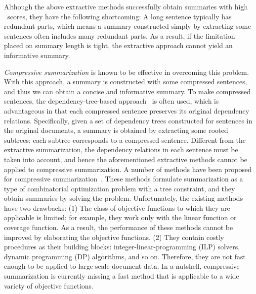 \documentclass[11pt,a4paper]{article}
\begin{document}
	
	Although the above extractive methods successfully 
	obtain summaries with high \rouge\ scores, %
	they have the following shortcoming: 
	A long sentence typically has redundant parts, 
	which means a summary constructed simply by extracting some sentences 
	often includes many redundant parts.  
	As a result, 
	if the limitation placed on summary length is tight, 
	the extractive approach cannot yield an informative summary.  
	
	{\it Compressive summarization} is 
	known to be effective in overcoming this problem.    
	With this approach, a summary is constructed with some compressed sentences, 
	and thus we can obtain a concise and informative summary.  
	To make compressed sentences, 
	the dependency-tree-based approach~\cite{filippova08} is often used, 
	which is advantageous in that 
	each compressed sentence preserves its original dependency relations. 
	Specifically, 
	given a set of dependency trees constructed 
	for sentences in the original documents, 
	a summary is obtained by extracting some rooted subtrees; 
	each subtree corresponds to a compressed sentence.  
	Different from the extractive summarization, 
	the dependency relations in each sentence must be taken into account,  
	and hence the aforementioned extractive methods cannot be applied to compressive summarization. 
	A number of methods have been proposed for compressive summarization~\cite{berg2011jointly,almeida2013fast,morita2013subtree,kikuchi2014single,hirao2017oracle}. 
	These methods formulate summarization   
	as a type of 
	combinatorial optimization problem with a tree constraint, 
	and they obtain summaries by solving the problem. 
	Unfortunately,  
	the existing methods have two drawbacks: 
	(1) The class of objective functions to which they are applicable is limited; 
	for example, they work only with the linear function or {coverage function}.  
	As a result, the performance of these methods cannot be improved by elaborating the objective functions.   
	(2) They contain costly procedures as their building blocks: 
	integer-linear-programming (ILP) solvers, 
	dynamic programming (DP) algorithms, and so on.  
	Therefore, they are not fast enough to be applied to large-scale document data. 
	In a nutshell, 
	compressive summarization is currently missing 
	a fast method that is applicable to a wide variety of objective functions. 
	
	
\end{document}
